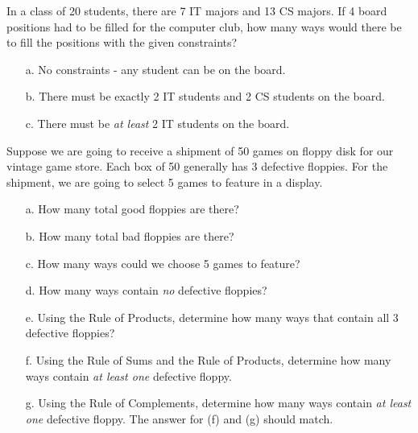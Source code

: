 {    
    \begin{questionNOGRADE}{\thequestion}
        In a class of 20 students, there are 7 IT majors and 13 CS majors.
        If 4 board positions had to be filled for the computer club,
        how many ways would there be to fill the positions with the given constraints?

        \begin{enumerate}
            \item[a.]   No constraints - any student can be on the board.
            \item[b.]   There must be exactly 2 IT students and 2 CS students on the board.
            \item[c.]   There must be \textit{at least} 2 IT students on the board.
        \end{enumerate}
    \end{questionNOGRADE}

    \newpage
    
    \begin{questionNOGRADE}{\thequestion}
        Suppose we are going to receive a shipment of 50 games on floppy disk for our vintage game store.
        Each box of 50 generally has 3 defective floppies.
        For the shipment, we are going to select 5 games to feature in a display.

        \begin{enumerate}
            \item[a.]   How many total good floppies are there?
            \item[b.]   How many total bad floppies are there?
            \item[c.]   How many ways could we choose 5 games to feature?
            
            \item[d.]   How many ways contain \textit{no} defective floppies?
            
            \item[e.]   Using the Rule of Products, determine how many ways that contain all 3 defective floppies?
                    
            \item[f.]   Using the Rule of Sums and the Rule of Products, determine
                        how many ways contain \textit{at least one} defective floppy.

            \item[g.]   Using the Rule of Complements, determine
                        how many ways contain \textit{at least one} defective floppy.
                        The answer for (f) and (g) should match.
        \end{enumerate}
        

\end{questionNOGRADE}}
